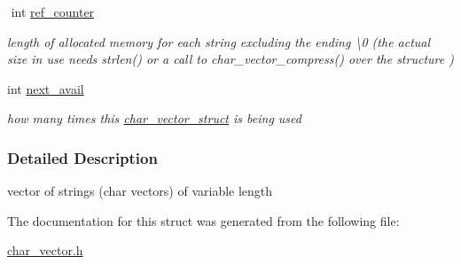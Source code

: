 \begin{DoxyCompactItemize}
$$\mbox{\label{structchar__vector__struct_a7537574d4f53bdb2796b3b1139b55479}} 
int \hyperlink{structchar__vector__struct_a7537574d4f53bdb2796b3b1139b55479}{ref\+\_\+counter}
\begin{DoxyCompactList}\small\item\em length of allocated memory for each string excluding the ending \textquotesingle{}\textbackslash{}0\textquotesingle{} (the actual size in use needs strlen() or a call to char\+\_\+vector\+\_\+compress() over the structure ) \end{DoxyCompactList}\item 
\mbox{\label{structchar__vector__struct_a766400c8be83bfabb2395c245d4c4505}} 
int \hyperlink{structchar__vector__struct_a766400c8be83bfabb2395c245d4c4505}{next\+\_\+avail}
\begin{DoxyCompactList}\small\item\em how many times this \hyperlink{structchar__vector__struct}{char\+\_\+vector\+\_\+struct} is being used \end{DoxyCompactList}\end{DoxyCompactItemize}


\subsubsection{Detailed Description}
vector of strings (char vectors) of variable length 

The documentation for this struct was generated from the following file\+:\begin{DoxyCompactItemize}
\item 
\hyperlink{char__vector_8h}{char\+\_\+vector.\+h}\end{DoxyCompactItemize}
